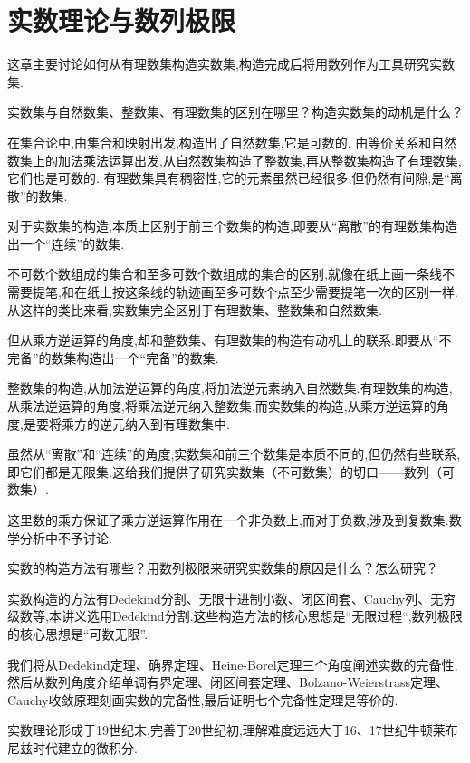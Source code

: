 \chapter{实数理论与数列极限}

这章主要讨论如何从有理数集构造实数集,构造完成后将用数列作为工具研究实数集.

\begin{note}实数集与自然数集、整数集、有理数集的区别在哪里？构造实数集的动机是什么？

在集合论中,由集合和映射出发,构造出了自然数集,它是可数的.
由等价关系和自然数集上的加法乘法运算出发,从自然数集构造了整数集,再从整数集构造了有理数集,它们也是可数的.
有理数集具有稠密性,它的元素虽然已经很多,但仍然有间隙,是“离散”的数集.

对于实数集的构造,本质上区别于前三个数集的构造,即要从“离散”的有理数集构造出一个“连续”的数集.

不可数个数组成的集合和至多可数个数组成的集合的区别,就像在纸上画一条线不需要提笔,和在纸上按这条线的轨迹画至多可数个点至少需要提笔一次的区别一样.从这样的类比来看,实数集完全区别于有理数集、整数集和自然数集.

但从乘方逆运算的角度,却和整数集、有理数集的构造有动机上的联系.即要从“不完备”的数集构造出一个“完备”的数集.

整数集的构造,从加法逆运算的角度,将加法逆元素纳入自然数集.有理数集的构造,从乘法逆运算的角度,将乘法逆元纳入整数集.而实数集的构造,从乘方逆运算的角度,是要将乘方的逆元纳入到有理数集中.
\end{note}

\begin{remark}
    虽然从“离散”和“连续”的角度,实数集和前三个数集是本质不同的,但仍然有些联系,即它们都是无限集.这给我们提供了研究实数集（不可数集）的切口——数列（可数集）.
\end{remark}

\begin{remark}
    这里数的乘方保证了乘方逆运算作用在一个非负数上,而对于负数,涉及到复数集.数学分析中不予讨论.%
\end{remark}

\begin{note}实数的构造方法有哪些？用数列极限来研究实数集的原因是什么？怎么研究？

    实数构造的方法有Dedekind分割、无限十进制小数、闭区间套、Cauchy列、无穷级数等,本讲义选用Dedekind分割.这些构造方法的核心思想是“无限过程“,数列极限的核心思想是“可数无限”.

    我们将从Dedekind定理、确界定理、Heine-Borel定理三个角度阐述实数的完备性,然后从数列角度介绍单调有界定理、闭区间套定理、Bolzano-Weierstrass定理、Cauchy收敛原理刻画实数的完备性,最后证明七个完备性定理是等价的.
    
\end{note}

\begin{remark}
    实数理论形成于19世纪末,完善于20世纪初,理解难度远远大于16、17世纪牛顿莱布尼兹时代建立的微积分.
\end{remark}



